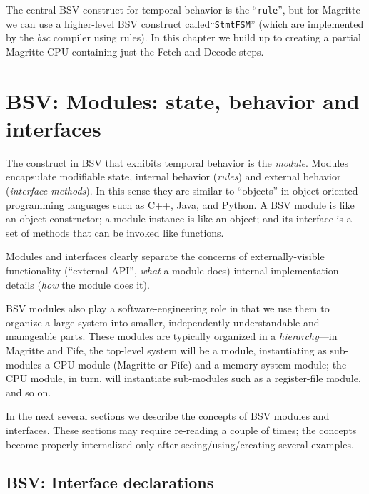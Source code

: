 The central BSV construct for temporal behavior is the
``\verb|rule|'', but for Magritte we can use a higher-level BSV
construct called``\verb|StmtFSM|'' (which are implemented by the
\emph{bsc} compiler using rules).  In this chapter we build up to
creating a partial Magritte CPU containing just the Fetch and Decode
steps.


\section{BSV: Modules: state, behavior and interfaces}

\label{Sec_Magritte_Fetch_Decode_Modules}


The construct in BSV that exhibits temporal behavior is the
\emph{module}.  Modules encapsulate modifiable state, internal
behavior (\emph{rules}) and external behavior (\emph{interface
methods}).  In this sense they are similar to ``objects'' in
object-oriented programming languages such as C++, Java, and Python.
A BSV module is like an object constructor; a module instance is like
an object; and its interface is a set of methods that can be invoked
like functions.

Modules and interfaces clearly separate the concerns of
externally-visible functionality (``external API'', \emph{what} a
module does) {\vs} internal implementation details (\emph{how} the
module does it).

BSV modules also play a software-engineering role in that we use them
to organize a large system into smaller, independently understandable
and manageable parts.  These modules are typically organized in a
\emph{hierarchy}---in Magritte and Fife, the top-level system will be
a module, instantiating as sub-modules a CPU module (Magritte or Fife)
and a memory system module; the CPU module, in turn, will instantiate
sub-modules such as a register-file module, and so on.

In the next several sections we describe the concepts of BSV modules
and interfaces.  These sections may require re-reading a couple of
times; the concepts become properly internalized only after
seeing/using/creating several examples.


\subsection{BSV: Interface declarations}

